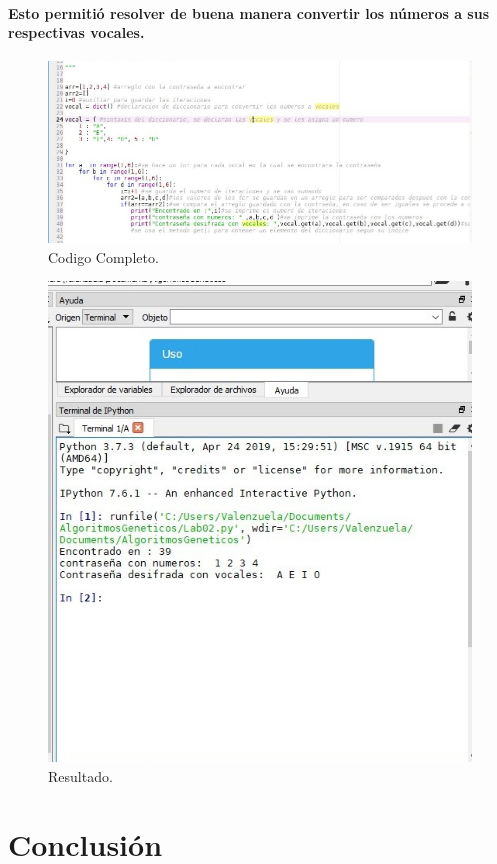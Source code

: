 \documentclass[10pt,a4paper]{article}
\begin{document}
\paragraph{Esto permiti\'o resolver de buena manera convertir los n\'umeros a sus respectivas vocales.}
\begin{figure}[H]
\includegraphics[scale=0.5] {img4.jpg}
\caption{Codigo Completo.}
\label{fig:cod4}
\end{figure}
\begin{figure}[H]
\includegraphics[scale=0.5] {img5.jpg}
\caption{Resultado.}
\label{fig:cod5}
\end{figure}
\section{Conclusi\'on}
\end{document}
